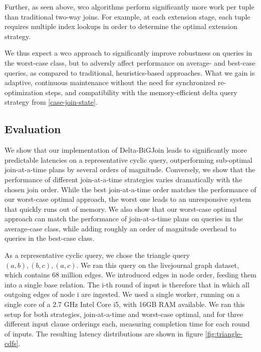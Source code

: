 \documentclass[../catalog.tex]{subfiles}
\begin{document}
Further, as seen above, wco algorithms perform significantly more work
per tuple than traditional two-way joins. For example, at each
extension stage, each tuple requires multiple index lookups in order
to determine the optimal extension strategy.

We thus expect a wco approach to significantly improve robustness on
queries in the worst-case class, but to adversly affect performance on
average- and best-case queries, as compared to traditional,
heuristics-based approaches. What we gain is adaptive, continuous
maintenance without the need for synchronized re-optimization steps,
and compatibility with the memory-efficient delta query strategy from
\autoref{case-join-state}.

\subsection{Evaluation}

We show that our implementation of Delta-BiGJoin leads to
significantly more predictable latencies on a representative cyclic
query, outperforming sub-optimal join-at-a-time plans by several
orders of magnitude. Conversely, we show that the performance of
different join-at-a-time strategies varies dramatically with the
chosen join order. While the best join-at-a-time order matches the
performance of our worst-case optimal approach, the worst one leads to
an unresponsive system that quickly runs out of memory. We also show
that our worst-case optimal approach can match the performance of
join-at-a-time plans on queries in the average-case class, while
adding roughly an order of magnitude overhead to queries in the
best-case class.

As a representative cyclic query, we chose the triangle query $(a,b),
(b,c), (a,c)$. We ran this query on the livejournal graph dataset,
which contains 68 million edges. We introduced edges in node order,
feeding them into a single base relation. The i-th round of input is
therefore that in which all outgoing edges of node i are ingested. We
used a single worker, running on a single core of a 2.7 GHz Intel Core
i5, with 16GB RAM available. We ran this setup for both strategies,
join-at-a-time and worst-case optimal, and for three different input
clause orderings each, measuring completion time for each round of
inputs. The resulting latency distributions are shown in figure
\ref{fig:triangle-cdfs}.
\end{document}
